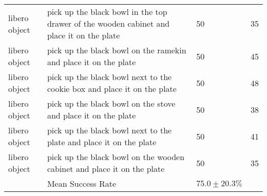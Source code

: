 \begin{table}[]
\begin{tabular}{llll}
libero object & pick up the black bowl in the top drawer of the wooden cabinet and place it on the plate & 50         & 35                                                              \\
libero object & pick up the black bowl on the ramekin and place it on the plate                          & 50         & 45                                                              \\
libero object & pick up the black bowl next to the cookie box and place it on the plate                  & 50         & 48                                                              \\
libero object & pick up the black bowl on the stove and place it on the plate                            & 50         & 38                                                              \\
libero object & pick up the black bowl next to the plate and place it on the plate                       & 50         & 41                                                              \\
libero object & pick up the black bowl on the wooden cabinet and place it on the plate                   & 50         & 35                                                              \\ \hline
              & Mean Success Rate                                                                        & $75.0\pm 20.3\%$ &                                                                
\end{tabular}
\end{table}